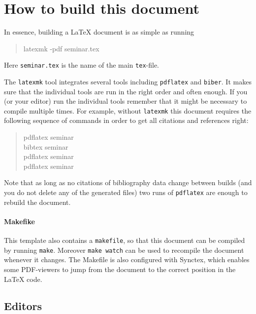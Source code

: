 \documentclass[]{tukseminar}
\newenvironment{displayshellcommand}{%
	\begin{quote}%
	\ttfamily%
}{%
	\end{quote}%
}
\begin{document}
\section{How to build this document}
In essence, building a \LaTeX{} document is as simple as running
\begin{displayshellcommand}
	latexmk -pdf seminar.tex
\end{displayshellcommand}
Here \lstinline!seminar.tex! is the name of the main \texttt{tex}-file.

The \lstinline!latexmk! tool integrates several tools including \lstinline!pdflatex! and \lstinline!biber!.
It makes sure that the individual tools are run in the right order and often enough.
If you (or your editor) run the individual tools remember that it might be necessary to compile multiple times.
For example, without \lstinline!latexmk! this document requires the following sequence of commands in order to get all citations and references right:
\begin{displayshellcommand}
  pdflatex seminar \\
  bibtex    seminar \\
  pdflatex seminar \\
  pdflatex seminar
\end{displayshellcommand}
Note that as long as no citations of bibliography data change between builds (and you do not delete any of the generated files) two runs of \texttt{pdflatex} are enough to rebuild the document.

\paragraph{Makefike} This template also contains a \lstinline!makefile!, so that this document can be compiled by running \lstinline!make!.
Moreover \lstinline!make watch! can be used to recompile the document whenever it changes.
The Makefile is also configured with Synctex, which enables some PDF-viewers to jump from the document to the correct position in the \LaTeX{} code.

\subsection{Editors}
\label{sec:editors}
\end{document}
